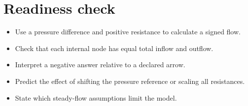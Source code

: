 \documentclass[11pt,letterpaper]{article}
\theoremstyle{definition}\newtheorem{definition}{Definition}\newtheorem{example}{Example}
\numberwithin{equation}{section}
\begin{document}
\section*{Readiness check}
\begin{itemize}
\item Use a pressure difference and positive resistance to calculate a signed flow.
\item Check that each internal node has equal total inflow and outflow.
\item Interpret a negative answer relative to a declared arrow.
\item Predict the effect of shifting the pressure reference or scaling all resistances.
\item State which steady-flow assumptions limit the model.
\end{itemize}
\end{document}
